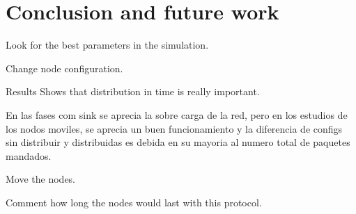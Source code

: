 \chapter{Conclusion and future work}
\label{chap:conclusionsandfuture}

Look for the best parameters in the simulation.

Change node configuration.

Results Shows that distribution in time is really important.

En las fases com sink se aprecia la sobre carga de la red, pero en los estudios de los nodos moviles, se aprecia un buen funcionamiento y la diferencia
de configs sin distribuir y distribuidas es debida en su mayoria al numero total de paquetes mandados.

Move the nodes.

Comment how long the nodes would last with this protocol.